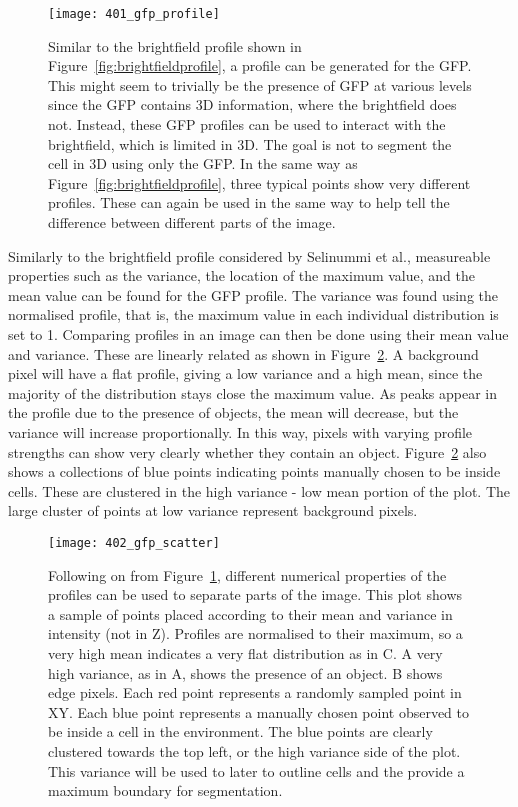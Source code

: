 \begin{figure}[h!]
 \centering
 \texttt{[image: 401\_gfp\_profile]}
 \caption[The GFP profile]{
 	Similar to the brightfield profile shown in Figure~\ref{fig:brightfieldprofile}, a profile can be generated for the GFP. This might seem to trivially be the presence of GFP at various levels since the GFP contains 3D information, where the brightfield does not. Instead, these GFP profiles can be used to interact with the brightfield, which is limited in 3D. The goal is not to segment the cell in 3D using only the GFP. In the same way as Figure~\ref{fig:brightfieldprofile}, three typical points show very different profiles. These can again be used in the same way to help tell the difference between different parts of the image.
 }
 \label{fig:gfpprofile}
\end{figure}

Similarly to the brightfield profile considered by Selinummi et al., measureable properties such as the variance, the location of the maximum value, and the mean value can be found for the GFP profile. The variance was found using the normalised profile, that is, the maximum value in each individual distribution is set to 1. Comparing profiles in an image can then be done using their mean value and variance. These are linearly related as shown in Figure~\ref{fig:gfpscatter}. A background pixel will have a flat profile, giving a low variance and a high mean, since the majority of the distribution stays close the maximum value. As peaks appear in the profile due to the presence of objects, the mean will decrease, but the variance will increase proportionally. In this way, pixels with varying profile strengths can show very clearly whether they contain an object. Figure~\ref{fig:gfpscatter} also shows a collections of blue points indicating points manually chosen to be inside cells. These are clustered in the high variance - low mean portion of the plot. The large cluster of points at low variance represent background pixels.

\begin{figure}[h!]
 \centering
 \texttt{[image: 402\_gfp\_scatter]}
 \caption[GFP scatter plot]{
 	Following on from Figure~\ref{fig:gfpprofile}, different numerical properties of the profiles can be used to separate parts of the image. This plot shows a sample of points placed according to their mean and variance in intensity (not in Z). Profiles are normalised to their maximum, so a very high mean indicates a very flat distribution as in C. A very high variance, as in A, shows the presence of an object. B shows edge pixels. Each red point represents a randomly sampled point in XY. Each blue point represents a manually chosen point observed to be inside a cell in the environment. The blue points are clearly clustered towards the top left, or the high variance side of the plot. This variance will be used to later to outline cells and the provide a maximum boundary for segmentation.
 }
 \label{fig:gfpscatter}
\end{figure}


